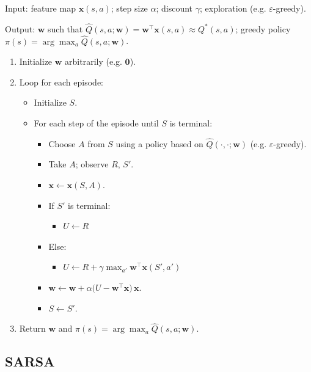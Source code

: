 \begin{implnote}
Input: feature map $\mathbf{x}(s,a)$; step size $\alpha$; discount $\gamma$; exploration (e.g. $\varepsilon$-greedy).

Output: $\mathbf{w}$ such that $\hat{Q}(s,a;\mathbf{w})=\mathbf{w}^\top\mathbf{x}(s,a)\approx Q^*(s,a)$; greedy policy $\pi(s)=\arg\max_a\hat{Q}(s,a;\mathbf{w})$.

\begin{enumerate}
\item Initialize $\mathbf{w}$ arbitrarily (e.g. $\mathbf{0}$).
\item Loop for each episode:
\begin{itemize}
\item Initialize $S$.
\item For each step of the episode until $S$ is terminal:
\begin{itemize}
\item Choose $A$ from $S$ using a policy based on $\hat{Q}(\cdot,\cdot;\mathbf{w})$ (e.g. $\varepsilon$-greedy).
\item Take $A$; observe $R$, $S'$.
\item $\mathbf{x}\leftarrow\mathbf{x}(S,A)$.
\item If $S'$ is terminal:
\begin{itemize}
\item $U\leftarrow R$
\end{itemize}
\item Else:
\begin{itemize}
\item $U\leftarrow R+\gamma\max_{a'}\mathbf{w}^\top\mathbf{x}(S',a')$
\end{itemize}
\item $\mathbf{w}\leftarrow\mathbf{w}+\alpha\bigl(U-\mathbf{w}^\top\mathbf{x}\bigr)\,\mathbf{x}$.
\item $S\leftarrow S'$.
\end{itemize}
\end{itemize}
\item Return $\mathbf{w}$ and $\pi(s)=\arg\max_a\hat{Q}(s,a;\mathbf{w})$.
\end{enumerate}

\end{implnote}

\subsection{SARSA}

